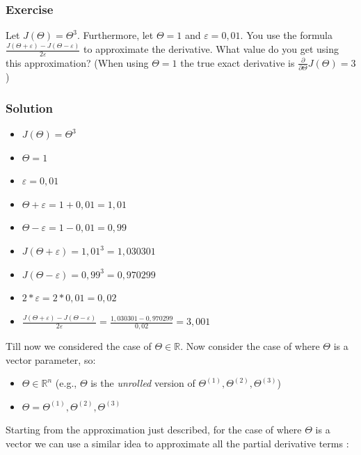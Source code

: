 \newpage
\begin{mdframed}[style=MyFrame]
\subsubsection{Exercise}
Let $J(\Theta) = \Theta^3$. Furthermore, let $\Theta = 1$ and $\varepsilon = 0,01$. You use the formula 
$\frac{J(\Theta + \varepsilon) - J(\Theta - \varepsilon)}{2 \varepsilon}$
to approximate the derivative. What value do you get using this approximation? (When using $\Theta = 1$ the true exact derivative is $\frac{\partial}{\partial \Theta} J(\Theta) = 3$)

\subsubsection{Solution}
\begin{itemize}
\item $J(\Theta) = \Theta^3$ \\
\item $\Theta = 1$ \\
\item $\varepsilon = 0,01$\\
\item $\Theta + \varepsilon = 1 + 0,01 = 1,01$ \\
\item $\Theta - \varepsilon = 1 - 0,01 = 0,99$ \\
\item $J(\Theta + \varepsilon) = 1,01^3 = 1,030301$\\
\item $J(\Theta - \varepsilon) = 0,99^3 = 0,970299$\\
\item $2 *  \varepsilon = 2 *0,01  = 0,02$\\
\item $\frac{J(\Theta + \varepsilon) - J(\Theta - \varepsilon)}{2 \varepsilon} = \frac{1,030301 - 0,970299}{0,02} = 3,001$
\end{itemize}
\end{mdframed}

Till now we considered the case of $\Theta \in \mathbb{R}$. Now consider the case of where $\Theta$ is a vector parameter, so: \\

\begin{itemize}
\item $\Theta \in \mathbb{R}^n$ (e.g., $\Theta$ is the {\it unrolled} version of $\Theta^{(1)}, \Theta^{(2)}, \Theta^{(3)}$) \\

\item $\Theta = \Theta^{(1)}, \Theta^{(2)}, \Theta^{(3)}$ \\
\end{itemize}
Starting from the approximation just described, for the case of where $\Theta$ is a vector we can use a similar idea to approximate all the partial derivative terms :

